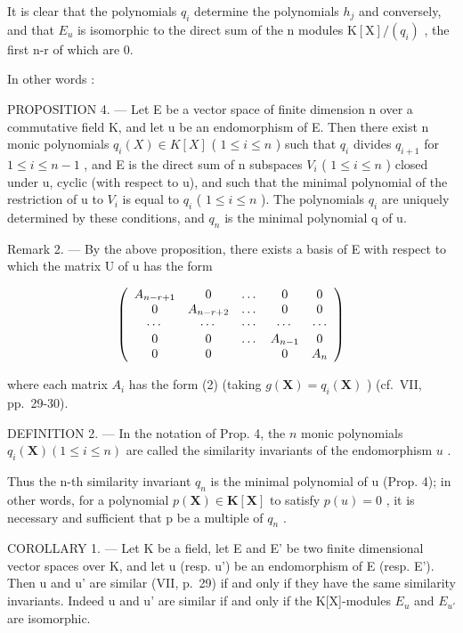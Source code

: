 It is clear that the polynomials \(q_{i}\) determine the polynomials \(h_{j}\) and conversely, and that \(E_{u}\) is isomorphic to the direct sum of the n modules \(\mathrm{K}[\mathrm{X}]/(q_{i})\) , the first n-r of which are 0.

In other words :

PROPOSITION 4. --- Let E be a vector space of finite dimension n over a commutative field K, and let u be an endomorphism of E. Then there exist n monic polynomials \(q_{i}(X) \in K[X]\) ( \(1 \leqslant i \leqslant n\) ) such that \(q_{i}\) divides \(q_{i+1}\) for \(1 \leqslant i \leqslant n-1\) , and E is the direct sum of n subspaces \(V_{i}\) ( \(1 \leqslant i \leqslant n\) ) closed under u, cyclic (with respect to u), and such that the minimal polynomial of the restriction of u to \(V_{i}\) is equal to \(q_{i}\) ( \(1 \leqslant i \leqslant n\) ). The polynomials \(q_{i}\) are uniquely determined by these conditions, and \(q_{n}\) is the minimal polynomial q of u.

Remark 2. --- By the above proposition, there exists a basis of E with respect to which the matrix U of u has the form

\[
\left( \begin{array}{c c c c c} A _ {n - r + 1} & 0 & \dots & 0 & 0 \\ 0 & A _ {n - r + 2} & \dots & 0 & 0 \\ \cdots & \cdots & \cdots & \cdots & \cdots \\ 0 & 0 & \dots & A _ {n - 1} & 0 \\ 0 & 0 & & 0 & A _ {n} \end{array} \right)
\]

where each matrix \(A_{i}\) has the form (2) (taking \(g(\mathbf{X}) = q_{i}(\mathbf{X})\) ) (cf.~VII, pp.~29-30).

DEFINITION 2. --- In the notation of Prop. 4, the \(n\) monic polynomials \(q_{i}(\mathbf{X}) (1 \leqslant i \leqslant n)\) are called the similarity invariants of the endomorphism \(u\) .

Thus the n-th similarity invariant \(q_{n}\) is the minimal polynomial of u (Prop. 4); in other words, for a polynomial \(p(\mathbf{X}) \in \mathbf{K}[\mathbf{X}]\) to satisfy \(p(u) = 0\) , it is necessary and sufficient that p be a multiple of \(q_{n}\) .

COROLLARY 1. --- Let K be a field, let E and E' be two finite dimensional vector spaces over K, and let u (resp. u') be an endomorphism of E (resp. E'). Then u and u' are similar (VII, p.~29) if and only if they have the same similarity invariants. Indeed u and u' are similar if and only if the K{[}X{]}-modules \(E_{u}\) and \(E_{u'}\) are isomorphic.

